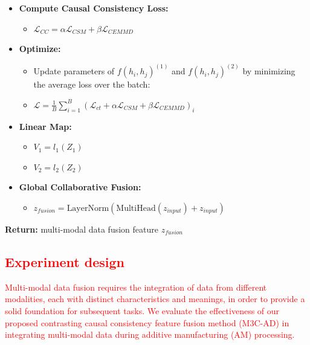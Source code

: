 \documentclass[preprint,12pt]{elsarticle}
\begin{document}
\begin{algorithm}[htbp]
\begin{itemize}
\begin{itemize}
\begin{itemize}
            \item \textbf{Compute Causal Consistency Loss:}
            \begin{itemize}
                \item ${\mathcal{L}}_{CC} = \alpha \mathcal{L}_{CSM} + \beta \mathcal{L}_{CEMMD}$
            \end{itemize}
            
            \item \textbf{Optimize:}
            \begin{itemize}
                \item Update parameters of $f({{h}_{i}}, {{h}_{j}})^{(1)}$ and $f({{h}_{i}}, {{h}_{j}})^{(2)}$ by minimizing the average loss over the batch:
                \item $\mathcal{L} = \frac{1}{B} \sum_{i=1}^{B} \left( {\mathcal{L}}_{ct} + \alpha \mathcal{L}_{CSM} + \beta \mathcal{L}_{CEMMD} \right)_{i}$
            \end{itemize}
            
            \item \textbf{Linear Map:}
            \begin{itemize}
                \item $V_1 = l_1(Z_1)$
                \item $V_2 = l_2(Z_2)$
            \end{itemize}
            
            \item \textbf{Global Collaborative Fusion:}
            \begin{itemize}
                \item $z_{fusion} = \text{LayerNorm}(\text{MultiHead}(z_{input}) + z_{input})$
            \end{itemize}
        \end{itemize}
    \end{itemize}
  
  \end{itemize}

  \textbf{Return:} multi-modal data fusion feature $z_{fusion}$
\end{algorithm}

\subsection{\textcolor{red}{Experiment design}}
\textcolor{red}{Multi-modal data fusion requires the integration of data from different modalities, each with distinct characteristics and meanings, in order to provide a solid foundation for subsequent tasks. We evaluate the effectiveness of our proposed contrasting causal consistency feature fusion method (M3C-AD) in integrating multi-modal data during additive manufacturing (AM) processing.} 
\end{document}
